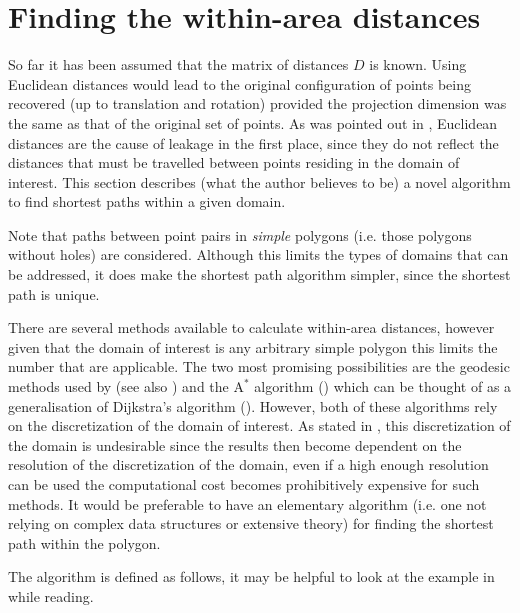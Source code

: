 \section{Finding the within-area distances}
\label{mdsdist}

So far it has been assumed that the matrix of distances $D$ is known. Using Euclidean distances would lead to the original configuration of points being recovered (up to translation and rotation) provided the projection dimension was the same as that of the original set of points. As was pointed out in , Euclidean distances are the cause of leakage in the first place, since they do not reflect the distances that must be travelled between points residing in the domain of interest. This section describes (what the author believes to be) \label{cor-r33}a novel algorithm to find shortest paths within a given domain.

Note that paths between point pairs in \textit{simple} polygons (i.e. those polygons without holes) are considered. Although this limits the types of domains that can be addressed, it does make the shortest path algorithm simpler, since the shortest path is unique.

There are several methods available to calculate within-area distances, however given that the domain of interest is any arbitrary simple polygon this limits the number that are applicable. The two most promising possibilities are the geodesic methods used by  (see also ) and the $\text{A}^*$ algorithm (\cite{astarpaper}) which can be thought of as a generalisation of Dijkstra's algorithm (\cite{dijkstra}). However, both of these algorithms rely on the discretization of the domain of interest. As stated in , this discretization of the domain is undesirable since the results then become dependent on the resolution of the discretization of the domain, even if a high enough resolution can be used the computational cost becomes prohibitively expensive for such methods. It would be preferable to have an elementary algorithm (i.e. one not relying on complex data structures or extensive theory) for finding the shortest path within the polygon.

The algorithm is defined as follows, it may be helpful to look at the example in  while reading.

